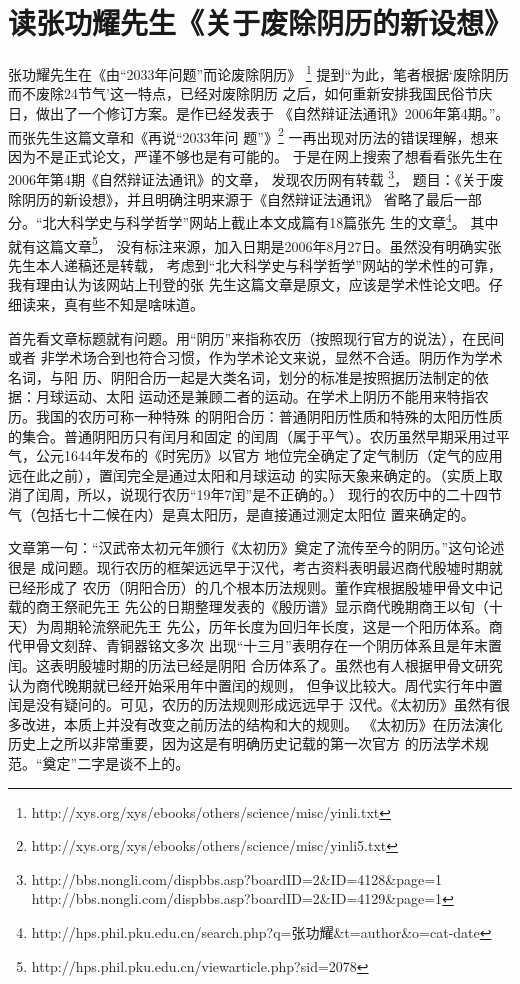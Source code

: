 \chapter{读张功耀先生《关于废除阴历的新设想》}

张功耀先生在《由“2033年问题”而论废除阴历》
\footnote{http://xys.org/xys/ebooks/others/science/misc/yinli.txt}
提到“为此，笔者根据‘废除阴历而不废除24节气’这一特点，已经对废除阴历
之后，如何重新安排我国民俗节庆日，做出了一个修订方案。是作已经发表于
《自然辩证法通讯》2006年第4期。”。而张先生这篇文章和《再说“2033年问
题”》\footnote{http://xys.org/xys/ebooks/others/science/misc/yinli5.txt}
一再出现对历法的错误理解，想来因为不是正式论文，严谨不够也是有可能的。
于是在网上搜索了想看看张先生在2006年第4期《自然辩证法通讯》的文章，
发现农历网有转载
\footnote{http://bbs.nongli.com/dispbbs.asp?boardID=2\&ID=4128\&page=1\\http://bbs.nongli.com/dispbbs.asp?boardID=2\&ID=4129\&page=1}，
题目：《关于废除阴历的新设想》，并且明确注明来源于《自然辩证法通讯》
省略了最后一部分。“北大科学史与科学哲学”网站上截止本文成篇有18篇张先
生的文章\footnote{http://hps.phil.pku.edu.cn/search.php?q=张功耀\&t=author\&o=cat-date}。
其中就有这篇文章\footnote{http://hps.phil.pku.edu.cn/viewarticle.php?sid=2078}，
没有标注来源，加入日期是2006年8月27日。虽然没有明确实张先生本人递稿还是转载，
考虑到“北大科学史与科学哲学”网站的学术性的可靠，我有理由认为该网站上刊登的张
先生这篇文章是原文，应该是学术性论文吧。仔细读来，真有些不知是啥味道。

首先看文章标题就有问题。用“阴历”来指称农历（按照现行官方的说法），在民间或者
非学术场合到也符合习惯，作为学术论文来说，显然不合适。阴历作为学术名词，与阳
历、阴阳合历一起是大类名词，划分的标准是按照据历法制定的依据：月球运动、太阳
运动还是兼顾二者的运动。在学术上阴历不能用来特指农历。我国的农历可称一种特殊
的阴阳合历：普通阴阳历性质和特殊的太阳历性质的集合。普通阴阳历只有闰月和固定
的闰周（属于平气）。农历虽然早期采用过平气，公元1644年发布的《时宪历》以官方
地位完全确定了定气制历（定气的应用远在此之前），置闰完全是通过太阳和月球运动
的实际天象来确定的。（实质上取消了闰周，所以，说现行农历“19年7闰”是不正确的。）
现行的农历中的二十四节气（包括七十二候在内）是真太阳历，是直接通过测定太阳位
置来确定的。

文章第一句：“汉武帝太初元年颁行《太初历》奠定了流传至今的阴历。”这句论述很是
成问题。现行农历的框架远远早于汉代，考古资料表明最迟商代殷墟时期就已经形成了
农历（阴阳合历）的几个根本历法规则。董作宾根据殷墟甲骨文中记载的商王祭祀先王
先公的日期整理发表的《殷历谱》显示商代晚期商王以旬（十天）为周期轮流祭祀先王
先公，历年长度为回归年长度，这是一个阳历体系。商代甲骨文刻辞、青铜器铭文多次
出现“十三月”表明存在一个阴历体系且是年末置闰。这表明殷墟时期的历法已经是阴阳
合历体系了。虽然也有人根据甲骨文研究认为商代晚期就已经开始采用年中置闰的规则，
但争议比较大。周代实行年中置闰是没有疑问的。可见，农历的历法规则形成远远早于
汉代。《太初历》虽然有很多改进，本质上并没有改变之前历法的结构和大的规则。
《太初历》在历法演化历史上之所以非常重要，因为这是有明确历史记载的第一次官方
的历法学术规范。“奠定”二字是谈不上的。

